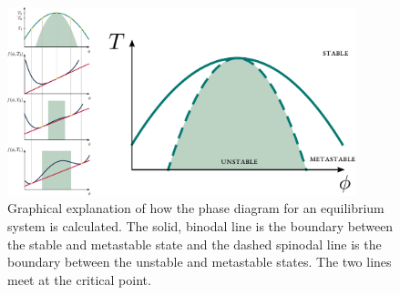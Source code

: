 \begin{figure}
    \centering
    \includegraphics[width=0.9\textwidth]{figures/bino_spino_scheme.pdf}
    \caption{Graphical explanation of how the phase diagram for an equilibrium system is calculated. The solid, binodal line is the boundary between the stable and metastable state and the dashed spinodal line is the boundary between the unstable and metastable states. The two lines meet at the critical point.}
    \label{fig:bino_spino_scheme}
\end{figure}


